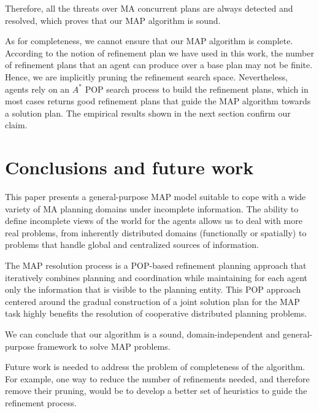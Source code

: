\documentclass[12pt]{article}
\begin{document}
Therefore, all the threats over MA concurrent plans are always detected and resolved, which proves that our MAP algorithm is sound.

As for completeness, we cannot ensure that our MAP algorithm is complete.
According to the notion of refinement plan we have used in this work, the number of refinement plans that an agent can produce over a base plan may not be finite.
Hence, we are implicitly pruning the refinement search space.
Nevertheless, agents rely on an $A^\ast$ POP search process to build the refinement plans, which in most cases returns good refinement plans that guide the MAP algorithm towards a solution plan.
The empirical results shown in the next section confirm our claim.

\section{Conclusions and future work}

This paper presents a general-purpose MAP model suitable to cope with a wide variety of MA planning domains under incomplete information.
The ability to define incomplete views of the world for the agents allows us to deal with more real problems, from inherently distributed domains (functionally or spatially) to problems that handle global and centralized sources of information.

The MAP resolution process is a POP-based refinement planning approach that iteratively combines planning and coordination while maintaining for each agent only the information that is visible to the planning entity.
This POP approach centered around the gradual construction of a joint solution plan for the MAP task highly benefits the resolution of cooperative distributed planning problems.

We can conclude that our algorithm is a sound, domain-independent and general-purpose framework to solve MAP problems.

Future work is needed to address the problem of completeness of the algorithm.
For example, one way to reduce the number of refinements needed, and therefore remove their pruning,
would be to develop a better set of heuristics to guide the refinement process.

\newpage
\printbibliography
\end{document}
